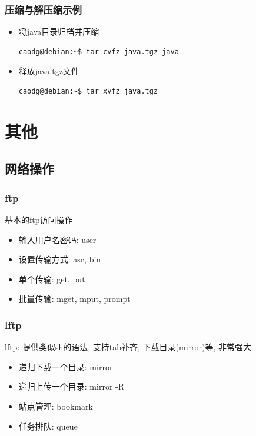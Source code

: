 \documentclass[compress]{beamer}
\begin{document}
\begin{frame}[containsverbatim]
\frametitle{压缩与解压缩示例}

\begin{itemize}

\item 将java目录归档并压缩\\
\begin{Verbatim}
caodg@debian:~$ tar cvfz java.tgz java
\end{Verbatim}

\item 释放java.tgz文件\\
\begin{Verbatim}
caodg@debian:~$ tar xvfz java.tgz
\end{Verbatim}

\end{itemize}
\end{frame}

\section{其他}

\subsection{网络操作}

\begin{frame}
\frametitle{ftp}

基本的ftp访问操作
\begin{itemize}
\item 输入用户名密码: user
\item 设置传输方式: asc, bin
\item 单个传输: get, put
\item 批量传输: mget, mput, prompt
\end{itemize}
\end{frame}

\begin{frame}
\frametitle{lftp}
lftp: 提供类似sh的语法, 支持tab补齐, 下载目录(mirror)等, 非常强大
\begin{itemize}
  \item 递归下载一个目录: mirror
  \item 递归上传一个目录: mirror -R
  \item 站点管理: bookmark
  \item 任务排队: queue
\end{itemize}
\end{frame}
\end{document}
